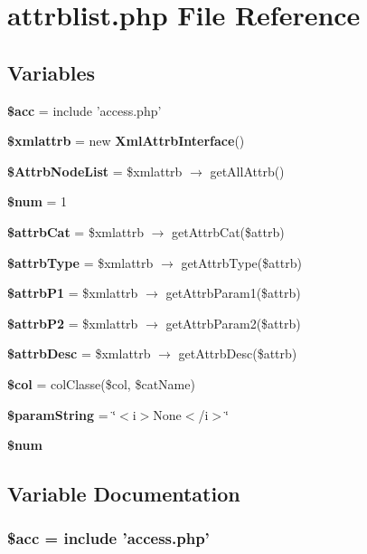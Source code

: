 \section{attrblist.php File Reference}
\label{attrblist_8php}


\subsection*{Variables}
\begin{CompactItemize}
\item 
{\bf \$acc} = include 'access.php'
\item 
{\bf \$xmlattrb} = new {\bf Xml\-Attrb\-Interface}()
\item 
{\bf \$Attrb\-Node\-List} = \$xmlattrb $\rightarrow$ get\-All\-Attrb()
\item 
{\bf \$num} = 1
\item 
{\bf \$attrb\-Cat} = \$xmlattrb $\rightarrow$ get\-Attrb\-Cat(\$attrb)
\item 
{\bf \$attrb\-Type} = \$xmlattrb $\rightarrow$ get\-Attrb\-Type(\$attrb)
\item 
{\bf \$attrb\-P1} = \$xmlattrb $\rightarrow$ get\-Attrb\-Param1(\$attrb)
\item 
{\bf \$attrb\-P2} = \$xmlattrb $\rightarrow$ get\-Attrb\-Param2(\$attrb)
\item 
{\bf \$attrb\-Desc} = \$xmlattrb $\rightarrow$ get\-Attrb\-Desc(\$attrb)
\item 
{\bf \$col} = col\-Classe(\$col, \$cat\-Name)
\item 
{\bf \$param\-String} = \char`\"{}$<$i$>$None$<$/i$>$\char`\"{}
\item 
{\bf \$num}
\end{CompactItemize}


\subsection{Variable Documentation}
\subsubsection{\setlength{\rightskip}{0pt plus 5cm}\$acc = include 'access.php'}\label{attrblist_8php_542926c588a05eb69553d79c83cf73da}



